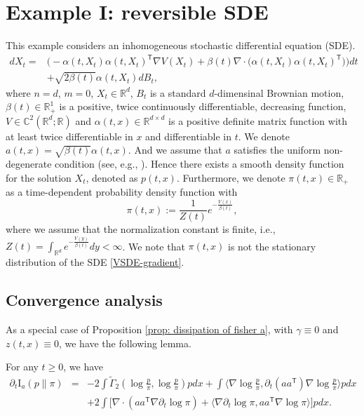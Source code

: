\documentclass[11pt,reqno]{amsart}
\newcommand{\la}{\langle}
\newcommand{\ra}{\rangle}
\newcommand{\ts}{\mathsf{T}}
\newcommand{\bea}{\begin{eqnarray}}
\newcommand{\eea}{\end{eqnarray}}
\def\pa{\partial}
\begin{document}
\section{Example I: reversible SDE}\label{sec4}
This example considers an inhomogeneous stochastic differential equation (SDE).
\begin{equation}\label{VSDE-gradient}
\begin{split}
    dX_t=&\Big(-\alpha(t,X_t)\alpha(t,X_t)^{\ts}\nabla V(X_t)+\beta(t)\nabla\cdot\Big(\alpha(t,X_t)\alpha(t,X_t)^{\ts}\Big)\Big)dt\\
    &+\sqrt{2\beta(t)} \alpha(t,X_t) dB_t,
    \end{split}
\end{equation}
   where $n=d$, $m=0$, $X_t\in \mathbb R^d$, $B_t$ is a standard $d$-dimensinal Brownian motion, $\beta(t)\in\mathbb{R}^1_+$ is a positive, twice continuously differentiable, decreasing function, $V\in \mathbb C^{2}(\mathbb{R}^d;\mathbb{R})$ and $\alpha(t,x)\in \mathbb R^{d\times d}$ is a positive definite matrix function with at least twice differentiable in $x$ and differentiable in $t$. We denote $a(t,x)=\sqrt{\beta(t)}\alpha(t,x)$. And we assume that $a$ satisfies the uniform non-degenerate condition (see, e.g., \cite{KusuokaStrook}). Hence there exists a smooth density function for the solution $X_t$, denoted as ${p} (t,x)$. Furthermore, we denote $\pi(t,x)\in\mathbb{R}_+$ as a time-dependent probability density function with 
\begin{equation}\label{defn: pi}
\pi(t,x):=\frac{1}{Z(t)}e^{-\frac{V(x)}{\beta(t)}}, 
\end{equation}
where we assume that the normalization constant is finite, i.e., $Z(t)=\int_{\mathbb{R}^d} e^{-\frac{V(y)}{\beta(t)}}dy<\infty$. We note that $\pi(t,x)$ is not the stationary distribution of the SDE \eqref{VSDE-gradient}. 


\subsection{Convergence analysis}
As a special case of Proposition \ref{prop: dissipation of fisher a}, with $\gamma\equiv 0$ and $z(t,x)\equiv 0$, we have the following  lemma.
\begin{lemma} \label{lemma: Fisher information decay}
For any $t\ge 0$, we have
	\bea
\pa_t\mathrm I_{a}({p} \|\pi) &=& -2\int \widetilde \Gamma_2(\log\frac{{p} }{\pi},\log\frac{{p} }{\pi}){p}  dx+\int \la \nabla\log\frac{{p} }{\pi},\pa_t(aa^{\ts})\nabla\log\frac{{p} }{\pi}\ra {p}  dx\\
	&& +2\int\big[
	\nabla\cdot(aa^{\ts}\nabla \pa_t\log\pi)+ \la \nabla \pa_t\log\pi, aa^{\ts}\nabla\log\pi\ra \big]{p}  dx.\nonumber
	\eea
\end{lemma}
\end{document}
